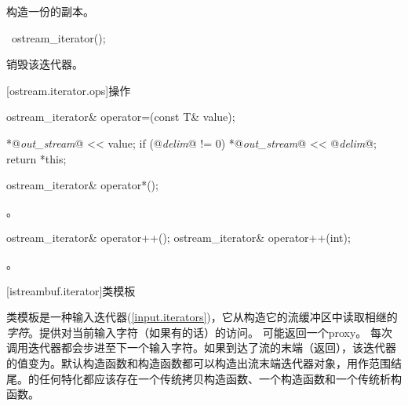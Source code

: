 \begin{itemdescr}
\pnum
\effects
构造一份的副本。
\end{itemdescr}

%
\begin{itemdecl}
~ostream_iterator();
\end{itemdecl}

\begin{itemdescr}
\pnum
\effects
销毁该迭代器。
\end{itemdescr}

[ostream.iterator.ops]{操作}

%
%
\begin{itemdecl}
ostream_iterator& operator=(const T& value);
\end{itemdecl}

\begin{itemdescr}
\pnum
\effects
\begin{codeblock}
*@\textit{out_stream}@ << value;
if (@\textit{delim}@ != 0)
  *@\textit{out_stream}@ << @\textit{delim}@;
return *this;
\end{codeblock}
\end{itemdescr}

%
%
\begin{itemdecl}
ostream_iterator& operator*();
\end{itemdecl}

\begin{itemdescr}
\pnum
\returns
{}。
\end{itemdescr}

%
%
\begin{itemdecl}
ostream_iterator& operator++();
ostream_iterator& operator++(int);
\end{itemdecl}

\begin{itemdescr}
\pnum
\returns
{}。
\end{itemdescr}

[istreambuf.iterator]{类模板}

\pnum
类模板是一种输入迭代器(\ref{input.iterators})，它从构造它的流缓冲区中读取相继的\textit{字符}。提供对当前输入字符（如果有的话）的访问。
\enternote {}可能返回一个proxy。 \exitnote
每次调用迭代器都会步进至下一个输入字符。如果到达了流的末端（返回），该迭代器的值变为。默认构造函数和构造函数都可以构造出流末端迭代器对象，用作范围结尾。的任何特化都应该存在一个传统拷贝构造函数、一个构造函数和一个传统析构函数。

